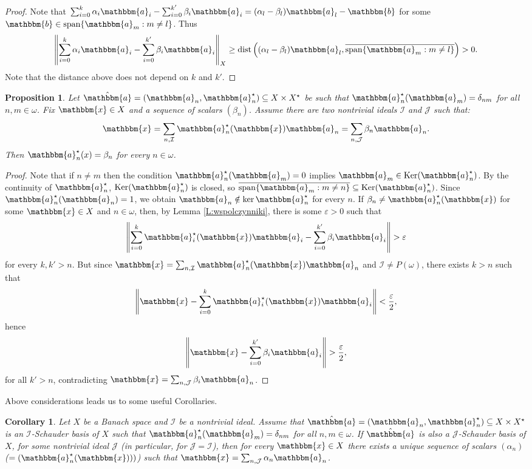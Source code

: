 \documentclass{amsart}
\newcommand{\on}{\operatorname}
\newcommand{\I}{\mathcal{I}}
\newcommand{\J}{\mathcal{J}}
\newcommand{\w}{\mathbbm}
\newtheorem{proposition}[theorem]{Proposition}
\newtheorem{corollary}[theorem]{Corollary}
\begin{document}
\begin{proof}
Note that $\sum_{i=0}^k \alpha_i\w{a}_i - \sum_{i=0}^{k'} \beta_i\w{a}_i=(\alpha_l-\beta_l)\w{a}_l-\w{b}$ for some $\w{b}\in \on{span}\{\w{a}_m:m \neq l\}$. Thus
\[
\left\|\sum_{i=0}^k \alpha_i\w{a}_i - \sum_{i=0}^{k'} \beta_i\w{a}_i\right\|_X\geq \on{dist}\left((\alpha_l-\beta_l)\w{a}_l, \overline{\on{span}\{\w{a}_m:m \neq l\}}\right)>0.
\]
Note that the distance above does not depend on $k$ and $k'$. 
\end{proof}

\begin{proposition}
\label{P:wspolczynniki}
Let $\hat{\w{a}}=(\w{a}_n,\w{a}^\star_n)\subseteq X\times X^\star$ be such that $\w{a}^\star_n(\w{a}_m)=\delta_{nm}$ for all $n,m\in\omega$. Fix $\w{x}\in X$ and a sequence of scalars $(\beta_n)$. Assume there are two nontrivial ideals $\I$ and $\J$ such that:
\[
\w{x}=\sum_{n,\I} \w{a}^\star_n(\w{x}) \w{a}_n= \sum_{n,\J} \beta_n \w{a}_n.
\]
Then $\w{a}_n^\star(x)=\beta_n$ for every $n\in \omega$. 
\end{proposition}

\begin{proof}
    Note that if $n\neq m$ then the condition $\w{a}^\star_n(\w{a}_m)=0$ implies $\w{a}_m\in \on{Ker}(\w{a}^\star_n)$. By the continuity of $\w{a}_n^\star$, $\on{Ker}(\w{a}^\star_n)$ is closed, so $\overline{\on{span}\{\w{a}_m: m \neq n\}}\subseteq \on{Ker}(\w{a}^\star_n)$. Since $\w{a}_n^\star(\w{a}_n)=1$, we obtain $\w{a}_n \notin \on{ker}\w{a}^\star_n$ for every $n$. If $\beta_n\neq \w{a}_n^\star(\w{x})$ for some $\w{x}\in X$ and $n\in \omega$, then, by Lemma \ref{L:wspolczynniki}, there is some $\varepsilon>0$ such that 
    \[
    \left\|\sum_{i=0}^k \w{a}^\star_i(\w{x}) \w{a}_i- \sum_{i=0}^{k'} \beta_i \w{a}_i \right\|>\varepsilon
    \]
    for every $k,k'>n$. But since $\w{x}=\sum_{n,\I} \w{a}^\star_n(\w{x}) \w{a}_n$ and $\I\neq P(\omega)$, there exists $k>n$ such that 
    \[
     \left\|\w{x}-\sum_{i=0}^k \w{a}^\star_i(\w{x}) \w{a}_i\right\|<\frac{\varepsilon}{2},
    \]
    hence 
    \[
     \left\|\w{x}-\sum_{i=0}^{k'} \beta_i \w{a}_i\right\|>\frac{\varepsilon}{2},
    \]
    for all $k'>n$, contradicting $\w{x}= \sum_{n,\J} \beta_i \w{a}_n$.
\end{proof}

Above considerations leads us to some useful Corollaries.

\begin{corollary}
Let $X$ be a Banach space and $\I$ be a nontrivial ideal. Assume that $\hat{\w{a}}=(\w{a}_n,\w{a}^\star_n)\subseteq X\times X^\star$ is an $\I$-Schauder basis of $X$ such that $\w{a}^\star_n(\w{a}_m)=\delta_{nm}$ for all $n,m\in\omega$. If $\hat{\w{a}}$ is also a $\J$-Schauder basis of $X$, for some nontrivial ideal $\J$ (in particular, for $\J=\I$), then for every $\w{x}\in X$ there exists a unique sequence of scalars $(\alpha_n)$ ($=(\w{a}_n^\star(\w{x})))$) such that $\w{x}=\sum_{n,\J}\alpha_n \w{a}_n$.
\end{corollary}
\end{document}
